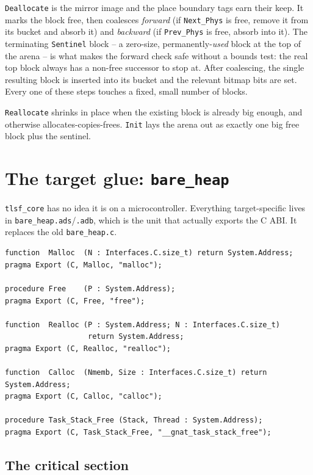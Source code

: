 \texttt{Deallocate} is the mirror image and the place boundary tags earn their
keep. It marks the block free, then coalesces \emph{forward} (if
\texttt{Next\_Phys} is free, remove it from its bucket and absorb it) and
\emph{backward} (if \texttt{Prev\_Phys} is free, absorb into it). The terminating
\texttt{Sentinel} block -- a zero-size, permanently-\emph{used} block at the top
of the arena -- is what makes the forward check safe without a bounds test: the
real top block always has a non-free successor to stop at. After coalescing, the
single resulting block is inserted into its bucket and the relevant bitmap bits
are set. Every one of these steps touches a fixed, small number of blocks.

\texttt{Reallocate} shrinks in place when the existing block is already big
enough, and otherwise allocates-copies-frees. \texttt{Init} lays the arena out as
exactly one big free block plus the sentinel.

\section{The target glue: \texttt{bare\_heap}}

\texttt{tlsf\_core} has no idea it is on a microcontroller. Everything
target-specific lives in \texttt{bare\_heap.ads}/\texttt{.adb}, which is the unit
that actually exports the C ABI. It replaces the old \texttt{bare\_heap.c}.

\begin{lstlisting}
function  Malloc  (N : Interfaces.C.size_t) return System.Address;
pragma Export (C, Malloc, "malloc");

procedure Free    (P : System.Address);
pragma Export (C, Free, "free");

function  Realloc (P : System.Address; N : Interfaces.C.size_t)
                   return System.Address;
pragma Export (C, Realloc, "realloc");

function  Calloc  (Nmemb, Size : Interfaces.C.size_t) return System.Address;
pragma Export (C, Calloc, "calloc");

procedure Task_Stack_Free (Stack, Thread : System.Address);
pragma Export (C, Task_Stack_Free, "__gnat_task_stack_free");
\end{lstlisting}

\subsection{The critical section}

